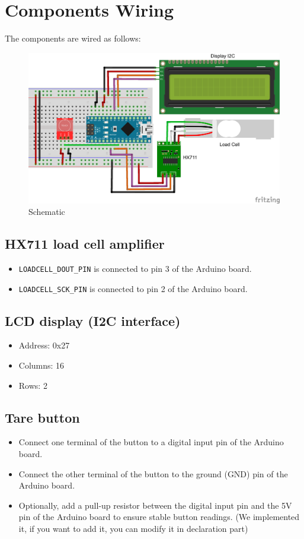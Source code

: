 \section{Components Wiring}
The components are wired as follows:

\begin{figure}[h]
\centering
\includegraphics[width=\textwidth]{medias/load_cell_schematic_bb.png}
\caption{Schematic}
\end{figure}

\subsection{HX711 load cell amplifier}
\begin{itemize}
\item \texttt{LOADCELL\_DOUT\_PIN} is connected to pin 3 of the Arduino board.
\item \texttt{LOADCELL\_SCK\_PIN} is connected to pin 2 of the Arduino board.
\end{itemize}

\subsection{LCD display (I2C interface)}
\begin{itemize}
\item Address: 0x27
\item Columns: 16
\item Rows: 2
\end{itemize}

\subsection{Tare button}
\begin{itemize}
\item Connect one terminal of the button to a digital input pin of the Arduino board.
\item Connect the other terminal of the button to the ground (GND) pin of the Arduino board.
\item Optionally, add a pull-up resistor between the digital input pin and the 5V pin of the Arduino board to ensure stable button readings. (We implemented it, if you want to add it, you can modify it in declaration part)
\end{itemize}